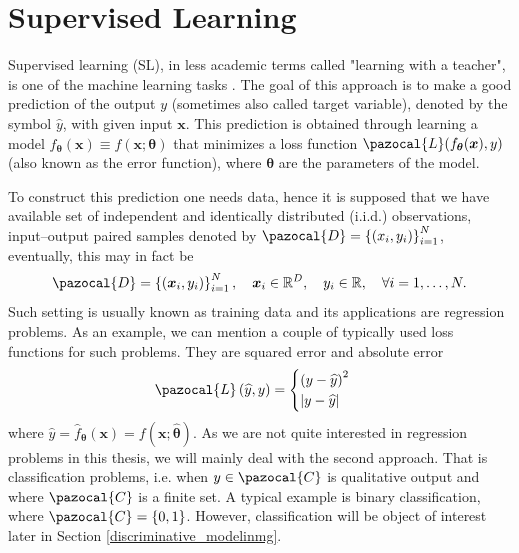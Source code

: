 \section{Supervised Learning}
Supervised learning (SL), in less academic terms called "learning with a teacher", is one of the machine learning tasks  \cite{supervised}.  The goal of this approach is to make a good prediction of the output $y$ (sometimes also called target variable), denoted by the symbol $\hat{y}$, with given input $\boldsymbol{x}$. This prediction is obtained through learning a model $f_{\boldsymbol{\theta}}\left(\boldsymbol{x}\right)\equiv f\left(\boldsymbol{x}; \boldsymbol{\theta}\right)$ that minimizes a loss function  $\pazocal{L}(f_{\boldsymbol{\theta}}(\boldsymbol{x}), y)$ (also known as the error function), where $\boldsymbol{\theta}$ are the parameters of the model. 

To construct this prediction one needs data, hence it is supposed that we have available set of independent and identically distributed (i.i.d.) observations, input--output paired samples denoted by $\pazocal{D} = \left\lbrace \left(x_i , y_i \right)\right\rbrace_{i=1}^N$, eventually, this may in fact be 
\begin{equation}
\pazocal{D} = \left\lbrace\left( \boldsymbol{x}_i , y_i \right)\right\rbrace_{i=1}^N,\quad \boldsymbol{x}_i \in \R^D,\quad y_i \in \R,\quad\forall i = 1,\dots,N.
\end{equation}
Such setting is usually known as training data and its applications are regression problems. As an example, we can mention a couple of typically used loss functions for such problems. They are squared error and absolute error
\begin{equation}
\pazocal{L}\left(\widehat{y}, y \right) =
 \begin{cases}
	 \left(y - \widehat{y}\right)^2 \\
	 \abs{y - \widehat{y}} \\
\end{cases}   
\end{equation}
where $\widehat{y} = \widehat{f}_{\boldsymbol{\theta}}\left(\boldsymbol{x}\right) = f(\boldsymbol{x}; \widehat{\boldsymbol{\theta}})$. As we are not quite interested in regression problems in this thesis, we will mainly deal with the second approach. That is classification problems, i.e. when $y \in \pazocal{C}$ is qualitative output and where $\pazocal{C}$ is a finite set.  A typical example is binary classification, where $\pazocal{C} = \left\lbrace0,1 \right\rbrace$. However, classification will be object of interest later in Section \ref{discriminative_modelinmg}.


